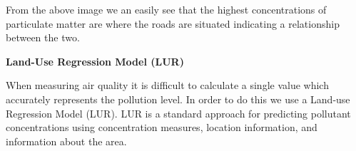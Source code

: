 From the above image we an easily see that the highest concentrations of particulate matter are where the roads are situated indicating a relationship between the two. 


\textbf{Land-Use Regression Model (LUR)}

When measuring air quality it is difficult to calculate a single value which accurately represents the pollution level. In order to do this we use a Land-use Regression Model (LUR). LUR is a standard approach for predicting pollutant concentrations using concentration measures, location information, and information about the area. 



